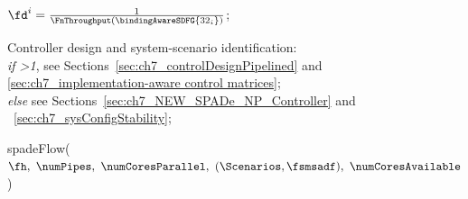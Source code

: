 \begin{algorithm}
{{{$\fd^i=\frac{1}{\FnThroughput(\bindingAwareSDFG{32_i})}$;~\label{algoStep:fd_i}\\
}
}

Controller design and system-scenario identification: \\
\nonl\hspace*{3mm} \emph{if \numPipes>1}, see Sections~\ref{sec:ch7_controlDesignPipelined} and \ref{sec:ch7_implementation-aware control matrices}; \\
\nonl\hspace*{3mm} \emph{else} see Sections~\ref{sec:ch7_NEW_SPADe_NP_Controller} and ~\ref{sec:ch7_sysConfigStability};\label{algoStep:sys_scenario}
}
\caption{\acrshort{spade}Flow($\fh,\ \numPipes,\ \numCoresParallel,\ (\Scenarios,\fsmsadf),\ \numCoresAvailable$)}\label{algo:SPADeFlow}
\end{algorithm}

